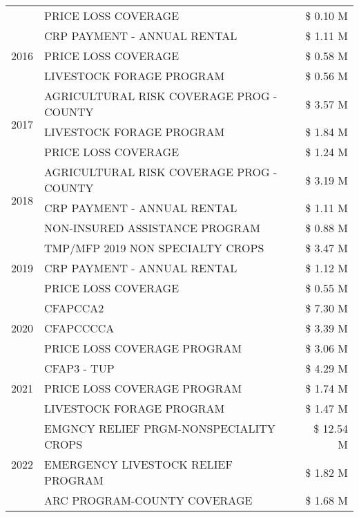 \begin{tabular}{llr}
 & PRICE LOSS COVERAGE & \$ 0.10 M \\
\cline{1-3}
\multirow[t]{3}{*}{2016} & CRP PAYMENT - ANNUAL RENTAL & \$ 1.11 M \\
 & PRICE LOSS COVERAGE & \$ 0.58 M \\
 & LIVESTOCK FORAGE PROGRAM & \$ 0.56 M \\
\cline{1-3}
\multirow[t]{3}{*}{2017} & AGRICULTURAL RISK COVERAGE PROG - COUNTY & \$ 3.57 M \\
 & LIVESTOCK FORAGE PROGRAM & \$ 1.84 M \\
 & PRICE LOSS COVERAGE & \$ 1.24 M \\
\cline{1-3}
\multirow[t]{3}{*}{2018} & AGRICULTURAL RISK COVERAGE PROG - COUNTY & \$ 3.19 M \\
 & CRP PAYMENT - ANNUAL RENTAL & \$ 1.11 M \\
 & NON-INSURED ASSISTANCE PROGRAM & \$ 0.88 M \\
\cline{1-3}
\multirow[t]{3}{*}{2019} & TMP/MFP 2019 NON SPECIALTY CROPS & \$ 3.47 M \\
 & CRP PAYMENT - ANNUAL RENTAL & \$ 1.12 M \\
 & PRICE LOSS COVERAGE & \$ 0.55 M \\
\cline{1-3}
\multirow[t]{3}{*}{2020} & CFAPCCA2 & \$ 7.30 M \\
 & CFAPCCCCA & \$ 3.39 M \\
 & PRICE LOSS COVERAGE PROGRAM & \$ 3.06 M \\
\cline{1-3}
\multirow[t]{3}{*}{2021} & CFAP3 - TUP & \$ 4.29 M \\
 & PRICE LOSS COVERAGE PROGRAM & \$ 1.74 M \\
 & LIVESTOCK FORAGE PROGRAM & \$ 1.47 M \\
\cline{1-3}
\multirow[t]{3}{*}{2022} & EMGNCY RELIEF PRGM-NONSPECIALITY CROPS & \$ 12.54 M \\
 & EMERGENCY LIVESTOCK RELIEF PROGRAM & \$ 1.82 M \\
 & ARC PROGRAM-COUNTY COVERAGE & \$ 1.68 M \\
\cline{1-3}
\bottomrule
\end{tabular}
